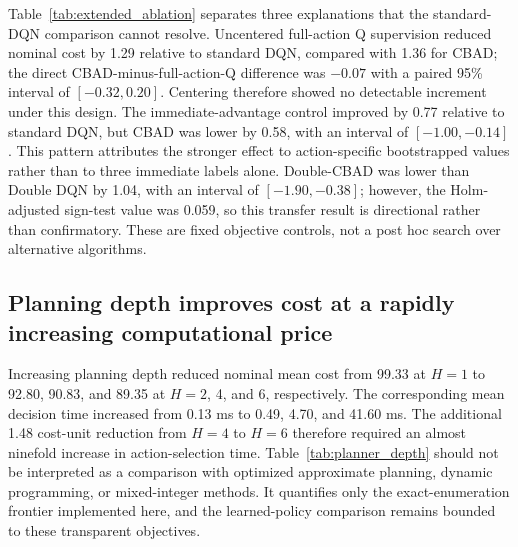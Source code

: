 \documentclass[11pt]{article}
\begin{document}
Table~\ref{tab:extended_ablation} separates three explanations that the standard-DQN comparison cannot resolve. Uncentered full-action Q supervision reduced nominal cost by 1.29 relative to standard DQN, compared with 1.36 for CBAD; the direct CBAD-minus-full-action-Q difference was $-0.07$ with a paired 95\% interval of $[-0.32,0.20]$. Centering therefore showed no detectable increment under this design. The immediate-advantage control improved by 0.77 relative to standard DQN, but CBAD was lower by 0.58, with an interval of $[-1.00,-0.14]$. This pattern attributes the stronger effect to action-specific bootstrapped values rather than to three immediate labels alone. Double-CBAD was lower than Double DQN by 1.04, with an interval of $[-1.90,-0.38]$; however, the Holm-adjusted sign-test value was 0.059, so this transfer result is directional rather than confirmatory. These are fixed objective controls, not a post hoc search over alternative algorithms.

\subsection{Planning depth improves cost at a rapidly increasing computational price}

\begin{table}[H]
\centering
\caption{Nominal receding-horizon planning over 400 unique held-out traces. Each planner has perfect knowledge of the next $H$ tasks and exogenous link states and exactly enumerates $3^H$ sequences before every action. Runtime was measured on the same workstation and includes only action selection after environment construction.}
\label{tab:planner_depth}
\resizebox{0.85\textwidth}{!}{}
\end{table}

Increasing planning depth reduced nominal mean cost from 99.33 at $H=1$ to 92.80, 90.83, and 89.35 at $H=2$, 4, and 6, respectively. The corresponding mean decision time increased from 0.13 ms to 0.49, 4.70, and 41.60 ms. The additional 1.48 cost-unit reduction from $H=4$ to $H=6$ therefore required an almost ninefold increase in action-selection time. Table~\ref{tab:planner_depth} should not be interpreted as a comparison with optimized approximate planning, dynamic programming, or mixed-integer methods. It quantifies only the exact-enumeration frontier implemented here, and the learned-policy comparison remains bounded to these transparent objectives.

\begin{table}[H]
\centering
\caption{Engineering outcome decomposition for CBAD relative to standard DQN. Delta columns report CBAD minus DQN. Negative values denote lower use or cost. Low-energy steps count decisions with remaining energy below 0.18; they are soft-threshold exposures, not certified safety violations.}
\label{tab:engineering}
\small
\setlength{\tabcolsep}{4pt}

\end{table}
\end{document}

